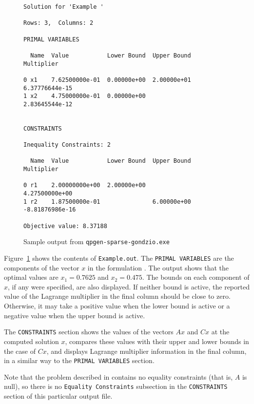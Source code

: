 \begin{figure}[hbt]
\begin{verbatim}
Solution for 'Example '

Rows: 3,  Columns: 2

PRIMAL VARIABLES

  Name  Value           Lower Bound  Upper Bound  Multiplier

0 x1    7.62500000e-01  0.00000e+00  2.00000e+01  6.37776644e-15
1 x2    4.75000000e-01  0.00000e+00               2.83645544e-12


CONSTRAINTS

Inequality Constraints: 2

  Name  Value           Lower Bound  Upper Bound  Multiplier

0 r1    2.00000000e+00  2.00000e+00               4.27500000e+00
1 r2    1.87500000e-01               6.00000e+00  -8.81876986e-16

Objective value: 8.37188
\end{verbatim}
\caption{Sample output from \texttt{qpgen-sparse-gondzio.exe}\label{sample-output}}
\end{figure}
Figure~\ref{sample-output} shows the contents of \texttt{Example.out}.
The {\tt PRIMAL VARIABLES} are the components of the vector $x$ in the
formulation . The output shows that the optimal values
are $x_1 = 0.7625$ and $x_2=0.475$.  The bounds on each component of
$x$, if any were specified, are also displayed. If neither bound is
active, the reported value of the Lagrange multiplier in the final
column should be close to zero. Otherwise, it may take a positive
value when the lower bound is active or a negative value when the
upper bound is active.

The \texttt{CONSTRAINTS} section shows the values of the vectors $Ax$
and $Cx$ at the computed solution $x$, compares these values with
their upper and lower bounds in the case of $Cx$, and displays
Lagrange multiplier information in the final column, in a similar way
to the {\tt PRIMAL VARIABLES} section.

Note that the problem described in  contains no
equality constraints (that is, $A$ is null), so there is no
\texttt{Equality Constraints} subsection in the \texttt{CONSTRAINTS}
section of this particular output file.

